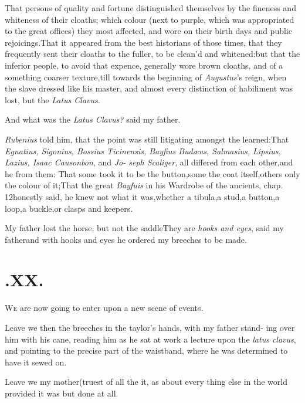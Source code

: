 \documentclass{article}
\begin{document}
\tsh That persons of quality and fortune distinguished
themselves by the fineness and whiteness of their cloaths; which
colour (next to purple, which was appropriated to the great
offices) they most affected, and wore on their birth days and
public rejoicings.\tsh That it appeared from the best
historians of those times, that they frequently sent their cloaths
to the fuller, to be clean’d and whitened:\tsh but
that the inferior people, to avoid that expence, generally wore
brown cloaths, and of a something coarser texture,\tsk till
towards the beginning of \textit{Augustus}’s reign, when the
slave dressed like his master, and almost every distinction of
habiliment was lost, but the \textit{Latus Clavus.}

And what was the \textit{Latus Clavus?} said my father.

\textit{Rubenius} told him, that the point was still litigating
amongst the learned:\tsh That \textit{Egnatius, Sigonius,
Bossius Ticinensis, Bayfius Budæus, Salmasius, Lipsius,
Lazius, Isaac Causonbon}, and \textit{Jo- seph Scaliger}, all
differed from each other,\tsk and he from them: That some took it
to be the button,\tsk some the coat itself,\tsk others only the
colour of it;\tsk That the great \textit{Bayfuis} in his Wardrobe
of the ancients, chap.\,12\tsk honestly said, he knew not what it
was,\tsk whether a tibula,\tsk a stud,\tsk a button,\tsk a
loop,\tsk a buckle,\tsk or clasps and
keepers.\tsh

\tsh My father lost the horse, but not the
saddle\tsh They are \textit{hooks and eyes}, said my
father\tsh and with hooks and eyes he ordered my breeches
to be made.

\section{.\enspace XX.}

\lettrine{W}{e} are now going to enter upon a new
scene of events.\tsh

\tsh Leave we then the breeches in the taylor’s
hands, with my father stand- ing over him with his cane, reading him
as he sat at work a lecture upon the \textit{latus clavus}, and
pointing to the precise part of the waistband, where he was
determined to have it sewed on.\tsh

Leave we my mother\tsk (truest of all the\break
{}\break
it, as about every thing else in the world
\tsh provided it was but done at all.\tsh
\end{document}
